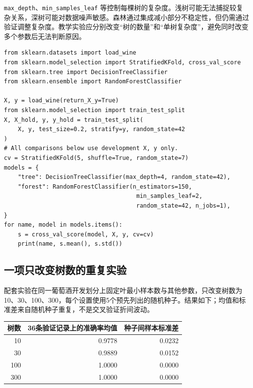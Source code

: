 \texttt{max\_depth}、\texttt{min\_samples\_leaf} 等控制每棵树的复杂度。浅树可能无法捕捉较复杂关系，深树可能对数据噪声敏感。森林通过集成减小部分不稳定性，但仍需通过验证调整复杂度。教学实验应分别改变“树的数量”和“单树复杂度”，避免同时改变多个参数后无法判断原因。

\begin{lstlisting}[caption={Wine：浅树与随机森林比较}]
from sklearn.datasets import load_wine
from sklearn.model_selection import StratifiedKFold, cross_val_score
from sklearn.tree import DecisionTreeClassifier
from sklearn.ensemble import RandomForestClassifier

X, y = load_wine(return_X_y=True)
from sklearn.model_selection import train_test_split
X, X_hold, y, y_hold = train_test_split(
    X, y, test_size=0.2, stratify=y, random_state=42
)
# All comparisons below use development X, y only.
cv = StratifiedKFold(5, shuffle=True, random_state=7)
models = {
    "tree": DecisionTreeClassifier(max_depth=4, random_state=42),
    "forest": RandomForestClassifier(n_estimators=150,
                                      min_samples_leaf=2,
                                      random_state=42, n_jobs=1),
}
for name, model in models.items():
    s = cross_val_score(model, X, y, cv=cv)
    print(name, s.mean(), s.std())
\end{lstlisting}



\subsection{一项只改变树数的重复实验}
配套实验在同一葡萄酒开发划分上固定叶最小样本数与其他参数，只改变树数为10、30、100、300，每个设置使用5个预先列出的随机种子。结果如下；均值和标准差来自随机种子重复，不是交叉验证折间波动。
\begin{center}\small
\begin{tabular}{rrr}\toprule
树数&36条验证记录上的准确率均值&种子间样本标准差\\\midrule
10&0.9778&0.0232\\
30&0.9889&0.0152\\
100&1.0000&0.0000\\
300&1.0000&0.0000\\\bottomrule
\end{tabular}\end{center}

